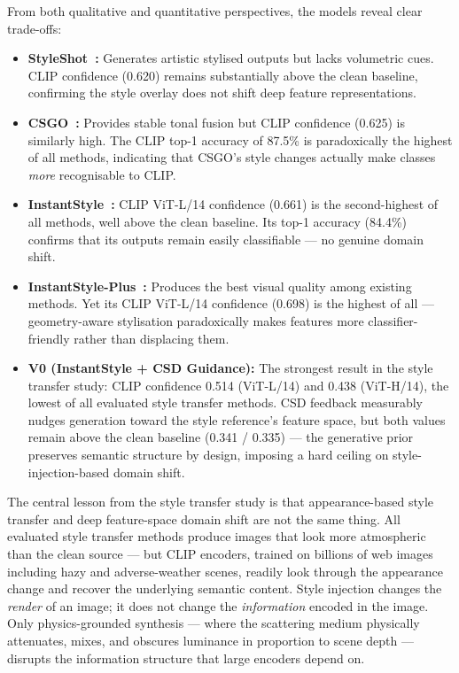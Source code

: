 From both qualitative and quantitative perspectives, the models reveal clear trade-offs:
\begin{itemize}
    \item \textbf{StyleShot~\cite{gao2024styleshot}:} Generates artistic stylised outputs but lacks volumetric cues. CLIP confidence (0.620) remains substantially above the clean baseline, confirming the style overlay does not shift deep feature representations.
    \item \textbf{CSGO~\cite{xing2024csgocomp}:} Provides stable tonal fusion but CLIP confidence (0.625) is similarly high. The CLIP top-1 accuracy of 87.5\% is paradoxically the highest of all methods, indicating that CSGO's style changes actually make classes \emph{more} recognisable to CLIP.
    \item \textbf{InstantStyle~\cite{wang2024instantstyle}:} CLIP ViT-L/14 confidence (0.661) is the second-highest of all methods, well above the clean baseline. Its top-1 accuracy (84.4\%) confirms that its outputs remain easily classifiable --- no genuine domain shift.
    \item \textbf{InstantStyle-Plus~\cite{wang2024instantstyleplus}:} Produces the best visual quality among existing methods. Yet its CLIP ViT-L/14 confidence (0.698) is the highest of all --- geometry-aware stylisation paradoxically makes features more classifier-friendly rather than displacing them.
    \item \textbf{V0 (InstantStyle + CSD Guidance):} The strongest result in the style transfer study: CLIP confidence 0.514 (ViT-L/14) and 0.438 (ViT-H/14), the lowest of all evaluated style transfer methods. CSD feedback measurably nudges generation toward the style reference's feature space, but both values remain above the clean baseline (0.341 / 0.335) --- the generative prior preserves semantic structure by design, imposing a hard ceiling on style-injection-based domain shift.
\end{itemize}

\noindent The central lesson from the style transfer study is that appearance-based style transfer and deep feature-space domain shift are not the same thing.
All evaluated style transfer methods produce images that look more atmospheric than the clean source --- but CLIP encoders, trained on billions of web images including hazy and adverse-weather scenes, readily look through the appearance change and recover the underlying semantic content.
Style injection changes the \emph{render} of an image; it does not change the \emph{information} encoded in the image.
Only physics-grounded synthesis --- where the scattering medium physically attenuates, mixes, and obscures luminance in proportion to scene depth --- disrupts the information structure that large encoders depend on.

